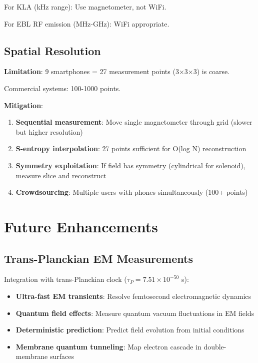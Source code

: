 \documentclass[12pt,a4paper]{article}
\begin{document}
For KLA (kHz range): Use magnetometer, not WiFi.

For EBL RF emission (MHz-GHz): WiFi appropriate.

\subsection{Spatial Resolution}

\textbf{Limitation}: 9 smartphones = 27 measurement points (3×3×3) is coarse.

Commercial systems: 100-1000 points.

\textbf{Mitigation}:
\begin{enumerate}
\item \textbf{Sequential measurement}: Move single magnetometer through grid (slower but higher resolution)
\item \textbf{S-entropy interpolation}: 27 points sufficient for O(log N) reconstruction
\item \textbf{Symmetry exploitation}: If field has symmetry (cylindrical for solenoid), measure slice and reconstruct
\item \textbf{Crowdsourcing}: Multiple users with phones simultaneously (100+ points)
\end{enumerate}

\section{Future Enhancements}

\subsection{Trans-Planckian EM Measurements}

Integration with trans-Planckian clock ($\tau_P = 7.51 \times 10^{-50}$ s):

\begin{itemize}
\item \textbf{Ultra-fast EM transients}: Resolve femtosecond electromagnetic dynamics
\item \textbf{Quantum field effects}: Measure quantum vacuum fluctuations in EM fields
\item \textbf{Deterministic prediction}: Predict field evolution from initial conditions
\item \textbf{Membrane quantum tunneling}: Map electron cascade in double-membrane surfaces
\end{itemize}
\end{document}
